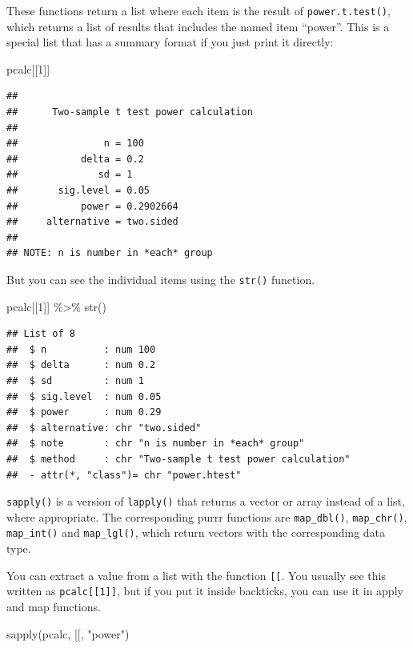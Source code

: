 \documentclass[
  oneside]{book}
\newenvironment{Shaded}{\begin{snugshade}}{\end{snugshade}}
\newcommand{\AttributeTok}[1]{\textcolor[rgb]{0.77,0.63,0.00}{#1}}
\newcommand{\DecValTok}[1]{\textcolor[rgb]{0.00,0.00,0.81}{#1}}
\newcommand{\FunctionTok}[1]{\textcolor[rgb]{0.00,0.00,0.00}{#1}}
\newcommand{\NormalTok}[1]{#1}
\newcommand{\SpecialCharTok}[1]{\textcolor[rgb]{0.00,0.00,0.00}{#1}}
\newcommand{\StringTok}[1]{\textcolor[rgb]{0.31,0.60,0.02}{#1}}
\begin{document}
These functions return a list where each item is the result of \texttt{power.t.test()}, which returns a list of results that includes the named item ``power''. This is a special list that has a summary format if you just print it directly:

\begin{Shaded}
\begin{Highlighting}[]
\NormalTok{pcalc[[}\DecValTok{1}\NormalTok{]]}
\end{Highlighting}
\end{Shaded}

\begin{verbatim}
## 
##      Two-sample t test power calculation 
## 
##               n = 100
##           delta = 0.2
##              sd = 1
##       sig.level = 0.05
##           power = 0.2902664
##     alternative = two.sided
## 
## NOTE: n is number in *each* group
\end{verbatim}

But you can see the individual items using the \texttt{str()} function.

\begin{Shaded}
\begin{Highlighting}[]
\NormalTok{pcalc[[}\DecValTok{1}\NormalTok{]] }\SpecialCharTok{\%\textgreater{}\%} \FunctionTok{str}\NormalTok{()}
\end{Highlighting}
\end{Shaded}

\begin{verbatim}
## List of 8
##  $ n          : num 100
##  $ delta      : num 0.2
##  $ sd         : num 1
##  $ sig.level  : num 0.05
##  $ power      : num 0.29
##  $ alternative: chr "two.sided"
##  $ note       : chr "n is number in *each* group"
##  $ method     : chr "Two-sample t test power calculation"
##  - attr(*, "class")= chr "power.htest"
\end{verbatim}

\texttt{sapply()} is a version of \texttt{lapply()} that returns a vector or array instead of a list, where appropriate. The corresponding purrr functions are \texttt{map\_dbl()}, \texttt{map\_chr()}, \texttt{map\_int()} and \texttt{map\_lgl()}, which return vectors with the corresponding data type.

You can extract a value from a list with the function \texttt{{[}{[}}. You usually see this written as \texttt{pcalc{[}{[}1{]}{]}}, but if you put it inside backticks, you can use it in apply and map functions.

\begin{Shaded}
\begin{Highlighting}[]
\FunctionTok{sapply}\NormalTok{(pcalc, }\StringTok{\textasciigrave{}}\AttributeTok{[[}\StringTok{\textasciigrave{}}\NormalTok{, }\StringTok{"power"}\NormalTok{)}
\end{Highlighting}
\end{Shaded}
\end{document}

